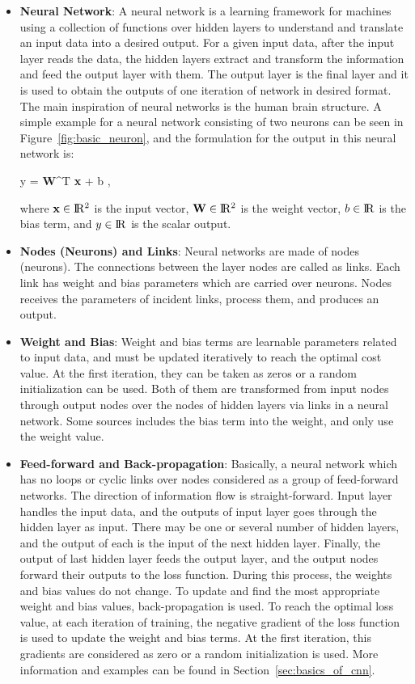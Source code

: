 \begin{itemize}
  
\item \textbf{Neural Network}: A neural network is a learning framework for machines using a collection of functions over hidden layers to understand and translate an input data into a desired output. For a given input data, after the input layer reads the data, the hidden layers extract and transform the information and feed the output layer with them. The output layer is the final layer and it is used to obtain the outputs of one iteration of network in desired format. The main inspiration of neural networks is the human brain structure. A simple example for a neural network consisting of two neurons can be seen in Figure~\ref{fig:basic_neuron}, and the formulation for the output in this neural network is:

\be 
y = \textbf{W}^{T} \textbf{x} + b \:,
\ee
 
where $\textbf{x} \in \rm I\!R^{2}$ is the input vector, $\textbf{W} \in \rm I\!R^{2}$ is the weight vector, $b \in \rm I\!R$ is the bias term, and $y \in \rm I\!R$ is the scalar output.
 
\item \textbf{Nodes (Neurons) and Links}:  Neural networks are made of nodes (neurons). The connections between the layer nodes are called as links. Each link has weight and bias parameters which are carried over neurons. Nodes receives the parameters of incident links, process them, and produces an output.
  
\item \textbf{Weight and Bias}: Weight and bias terms are learnable parameters related to input data, and must be updated iteratively to reach the optimal cost value. At the first iteration, they can be taken as zeros or a random initialization can be used. Both of them are transformed from input nodes through output nodes over the nodes of hidden layers via links in a neural network. Some sources includes the bias term into the weight, and only use the weight value.

\item \textbf{Feed-forward and Back-propagation}: Basically, a neural network which has no loops or cyclic links over nodes considered as a group of feed-forward networks. The direction of information flow is straight-forward. Input layer handles the input data, and the outputs of input layer goes through the hidden layer as input. There may be one or several number of hidden layers, and the output of each is the input of the next hidden layer. Finally, the output of last hidden layer feeds the output layer, and the output nodes forward their outputs to the loss function. During this process, the weights and bias values do not change. To update and find the most appropriate weight and bias values, back-propagation is used. To reach the optimal loss value, at each iteration of training, the negative gradient of the loss function is used to update the weight and bias terms. At the first iteration, this gradients are considered as zero or a random initialization is used. More information and examples can be found in Section~\ref{sec:basics_of_cnn}.


\end{itemize}
